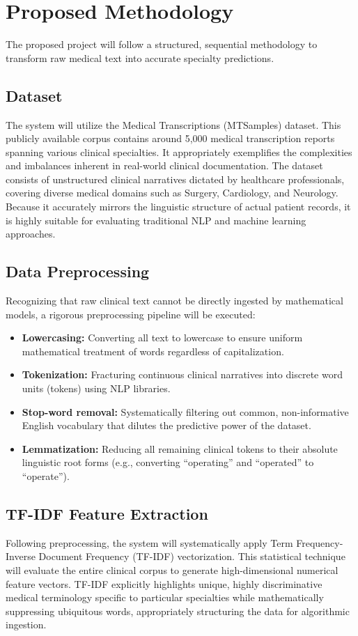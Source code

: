 \chapter{Proposed Methodology}
The proposed project will follow a structured, sequential methodology to transform raw medical text into accurate specialty predictions.

\section{Dataset}
The system will utilize the Medical Transcriptions (MTSamples) dataset. This publicly available corpus contains around 5,000 medical transcription reports spanning various clinical specialties. It appropriately exemplifies the complexities and imbalances inherent in real-world clinical documentation. The dataset consists of unstructured clinical narratives dictated by healthcare professionals, covering diverse medical domains such as Surgery, Cardiology, and Neurology. Because it accurately mirrors the linguistic structure of actual patient records, it is highly suitable for evaluating traditional NLP and machine learning approaches.

\section{Data Preprocessing}
Recognizing that raw clinical text cannot be directly ingested by mathematical models, a rigorous preprocessing pipeline will be executed:
\begin{itemize}
    \item \textbf{Lowercasing:} Converting all text to lowercase to ensure uniform mathematical treatment of words regardless of capitalization.
    \item \textbf{Tokenization:} Fracturing continuous clinical narratives into discrete word units (tokens) using NLP libraries.
    \item \textbf{Stop-word removal:} Systematically filtering out common, non-informative English vocabulary that dilutes the predictive power of the dataset.
    \item \textbf{Lemmatization:} Reducing all remaining clinical tokens to their absolute linguistic root forms (e.g., converting ``operating'' and ``operated'' to ``operate'').
\end{itemize}

\section{TF-IDF Feature Extraction}
Following preprocessing, the system will systematically apply Term Frequency-Inverse Document Frequency (TF-IDF) vectorization. This statistical technique will evaluate the entire clinical corpus to generate high-dimensional numerical feature vectors. TF-IDF explicitly highlights unique, highly discriminative medical terminology specific to particular specialties while mathematically suppressing ubiquitous words, appropriately structuring the data for algorithmic ingestion.

